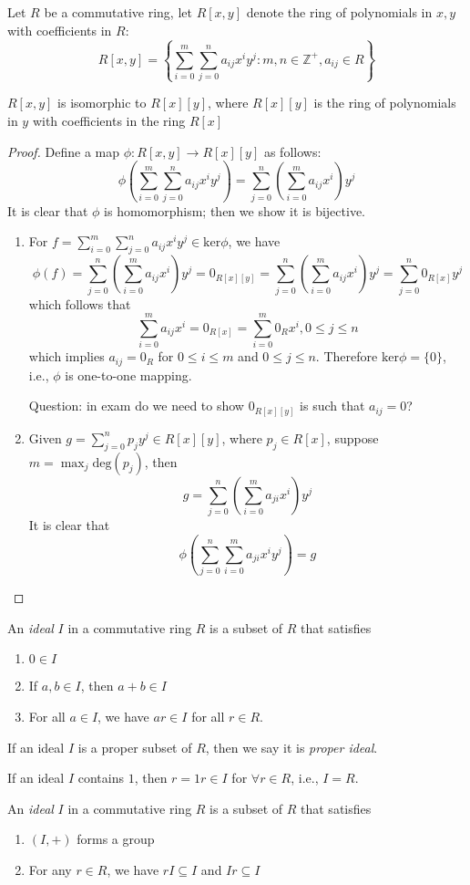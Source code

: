 \begin{definition}
Let $R$ be a commutative ring, let $R[x,y]$ denote the ring of polynomials in $x,y$ with coefficients in $R$:
\[
R[x,y]=\left\{
\sum_{i=0}^m\sum_{j=0}^na_{ij}x^iy^j:m,n\in\mathbb{Z}^+,a_{ij}\in R
\right\}
\]
\end{definition}
\begin{proposition}
$R[x,y]$ is isomorphic to $R[x][y]$, where $R[x][y]$ is the ring of polynomials in $y$ with coefficients in the ring $R[x]$
\end{proposition}
\begin{proof}
Define a map $\phi:R[x,y]\to R[x][y]$ as follows:
\[
\phi\left(
\sum_{i=0}^m\sum_{j=0}^na_{ij}x^iy^j
\right)
=
\sum_{j=0}^n\left(
\sum_{i=0}^ma_{ij}x^i
\right)y^j
\]
It is clear that $\phi$ is homomorphism; then we show it is bijective.
\begin{enumerate}
\item
For $f=\sum_{i=0}^m\sum_{j=0}^na_{ij}x^iy^j\in\mbox{ker}\phi$, we have
\[
\phi(f)=\sum_{j=0}^n\left(
\sum_{i=0}^ma_{ij}x^i
\right)y^j=0_{R[x][y]}=\sum_{j=0}^n\left(
\sum_{i=0}^ma_{ij}x^i
\right)y^j=\sum_{j=0}^n0_{R[x]}y^j
\]
which follows that
\[
\sum_{i=0}^ma_{ij}x^i=0_{R[x]}=\sum_{i=0}^m0_Rx^i,0\le j\le n
\]
which implies $a_{ij}=0_R$ for $0\le i\le m$ and $0\le j\le n$. Therefore $\mbox{ker}\phi=\{0\}$, i.e., $\phi$ is one-to-one mapping.

Question: in exam do we need to show $0_{R[x][y]}$ is such that $a_{ij}=0$?
\item
Given $g=\sum_{j=0}^np_jy^j\in R[x][y]$, where $p_j\in R[x]$, suppose $m=\max_j\mbox{deg}(p_j)$, then
\[
g=\sum_{j=0}^n(\sum_{i=0}^ma_{ji}x^i)y^j
\]
It is clear that
\[
\phi(\sum_{j=0}^n\sum_{i=0}^ma_{ji}x^iy^j)=g
\]
\end{enumerate}
\end{proof}

\begin{definition}[Ideal]
An \emph{ideal} $I$ in a commutative ring $R$ is a subset of $R$ that satisfies
\begin{enumerate}
\item
$0\in I$
\item
If $a,b\in I$, then $a+b\in I$
\item
For all $a\in I$, we have $ar\in I$ for all $r\in R$.
\end{enumerate}
If an ideal $I$ is a proper subset of $R$, then we say it is \emph{proper ideal}.
\end{definition}
\begin{remark}
If an ideal $I$ contains $1$, then $r=1r\in I$ for $\forall r\in R$, i.e., $I=R$.
\end{remark}
\begin{definition}
An \emph{ideal} $I$ in a commutative ring $R$ is a subset of $R$ that satisfies
\begin{enumerate}
\item
$(I,+)$ forms a group
\item
For any $r\in R$, we have $rI\subseteq I$ and $Ir\subseteq I$
\end{enumerate}
\end{definition}

